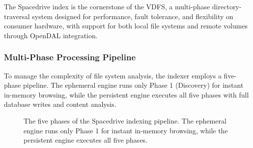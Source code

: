 \documentclass[sigconf]{acmart}
\begin{document}
The Spacedrive index is the cornerstone of the VDFS, a multi-phase directory-traversal system designed for performance, fault tolerance, and flexibility on consumer hardware, with support for both local file systems and remote volumes through OpenDAL integration.

\subsubsection{Multi-Phase Processing Pipeline}

To manage the complexity of file system analysis, the indexer employs a five-phase pipeline. The ephemeral engine runs only Phase 1 (Discovery) for instant in-memory browsing, while the persistent engine executes all five phases with full database writes and content analysis.

\begin{figure}[h]
\centering
{}
\caption{The five phases of the Spacedrive indexing pipeline. The ephemeral engine runs only Phase 1 for instant in-memory browsing, while the persistent engine executes all five phases.}
\label{fig:indexing_pipeline}
\end{figure}
\end{document}
